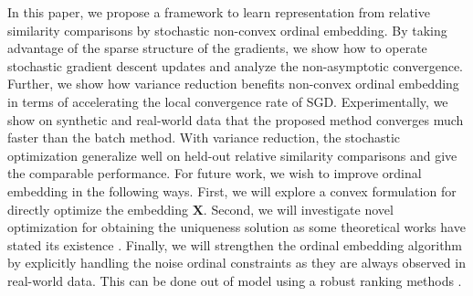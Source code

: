 \documentclass[letterpaper]{article}
\begin{document}
		In this paper, we propose a framework to learn representation from relative similarity comparisons by stochastic non-convex ordinal embedding. By taking advantage of the sparse structure of the gradients, we show how to operate stochastic gradient descent updates and analyze the non-asymptotic convergence. Further, we show how variance reduction benefits non-convex ordinal embedding in terms of accelerating the local convergence rate of SGD. Experimentally, we show on synthetic and real-world data that the proposed method converges much faster than the batch method. With variance reduction, the stochastic optimization generalize well on held-out relative similarity comparisons and give the comparable performance. For future work, we wish to improve ordinal embedding in the following ways. First, we will explore a convex formulation for directly optimize the embedding $\mathbf{X}$. Second, we will investigate novel optimization for obtaining the uniqueness solution as some theoretical works have stated its existence \cite{2015arXiv150102861A,53e99af7b7602d97023851bf}. Finally, we will strengthen the ordinal embedding algorithm by explicitly handling the noise ordinal constraints as they are always observed in real-world data. This can be done out of model using a robust ranking methods \cite{2014arXiv1408.3467X}.

		
		

	
\end{document}
